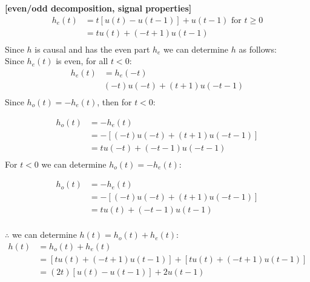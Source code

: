 \documentclass{article}
\begin{document}
 {\bf [even/odd decomposition, signal properties]}\\
\begin{equation*}
\begin{split}
    h_e(t) &= t[u(t) - u(t - 1)] + u(t - 1) \text{ for $t \geq 0$}\\
    &= tu(t) + (-t + 1) u (t - 1)\\
\end{split}
\end{equation*}
Since $h$ is causal and has the even part $h_e$ we can determine $h$ as follows:\\

Since $h_e(t)$ is even, for all $t < 0$:
\begin{equation*}
\begin{split}
    h_e(t) &= h_e(-t)\\
    & (-t)u(-t) + (t + 1) u (-t - 1)\\
\end{split}
\end{equation*}
 Since $h_o(t) = -h_e(t)$, then for $t < 0$:

\begin{equation*}
\begin{split}
    h_o(t) &= -h_e(t)\\
    &= -[(-t)u(-t) + (t + 1) u (-t - 1)]\\
    &= t u (-t) + (-t - 1) u (-t - 1)\\
\end{split}
\end{equation*} 
For $t < 0$ we can determine $h_o(t) = -h_e(t)$:

\begin{equation*}
\begin{split}
    h_o(t) &= -h_e(t)\\
    &= -[(-t) u (-t) + (t + 1) u (-t - 1)]\\
    &= t u (t) + (-t - 1) u (t - 1)\\
\end{split}
\end{equation*} 

$\therefore$ we can determine $h(t) = h_o(t) + h_e(t)$:
\begin{equation*}
\begin{split}
    h(t) &= h_o(t) + h_e(t)\\
    &= [tu(t) + (-t + 1) u (t - 1)] + [tu(t) + (-t + 1) u (t - 1)]\\
    &= (2t) [u(t) - u(t - 1)] + 2u(t - 1)\\
\end{split}
\end{equation*} 
\end{document}
